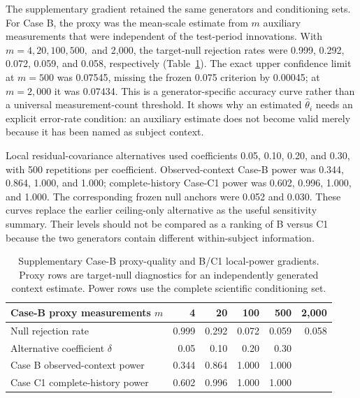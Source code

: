 \documentclass[11pt]{article}
\theoremstyle{definition}
\begin{document}
The supplementary gradient retained the same generators and conditioning sets. For Case B,
the proxy was the mean-scale estimate from $m$ auxiliary measurements that were independent
of the test-period innovations. With $m=4,20,100,500,$ and 2,000, the target-null rejection
rates were 0.999, 0.292, 0.072, 0.059, and 0.058, respectively
(Table~\ref{tab:bc-gradients}). The exact upper confidence limit at $m=500$ was 0.07545,
missing the frozen 0.075 criterion by 0.00045; at $m=2{,}000$ it was 0.07434. This is a
generator-specific accuracy curve rather than a universal measurement-count threshold. It
shows why an estimated $\widehat\theta_i$ needs an explicit error-rate condition: an auxiliary
estimate does not become valid merely because it has been named as subject context.

Local residual-covariance alternatives used coefficients 0.05, 0.10, 0.20, and 0.30, with
500 repetitions per coefficient. Observed-context Case-B power was 0.344, 0.864, 1.000, and
1.000; complete-history Case-C1 power was 0.602, 0.996, 1.000, and 1.000. The corresponding
frozen null anchors were 0.052 and 0.030. These curves replace the earlier ceiling-only
alternative as the useful sensitivity summary. Their levels should not be compared as a
ranking of B versus C1 because the two generators contain different within-subject
information.

\begin{table}[!ht]
\centering
\caption{Supplementary Case-B proxy-quality and B/C1 local-power gradients. Proxy rows are
target-null diagnostics for an independently generated context estimate. Power rows use the
complete scientific conditioning set.}
\label{tab:bc-gradients}
\begin{tabular}{lrrrrr}
\toprule
Case-B proxy measurements $m$ & 4 & 20 & 100 & 500 & 2,000 \\
\midrule
Null rejection rate & 0.999 & 0.292 & 0.072 & 0.059 & 0.058 \\
\midrule
Alternative coefficient $\delta$ & 0.05 & 0.10 & 0.20 & 0.30 & \\
\midrule
Case B observed-context power & 0.344 & 0.864 & 1.000 & 1.000 & \\
Case C1 complete-history power & 0.602 & 0.996 & 1.000 & 1.000 & \\
\bottomrule
\end{tabular}
\end{table}
\end{document}
